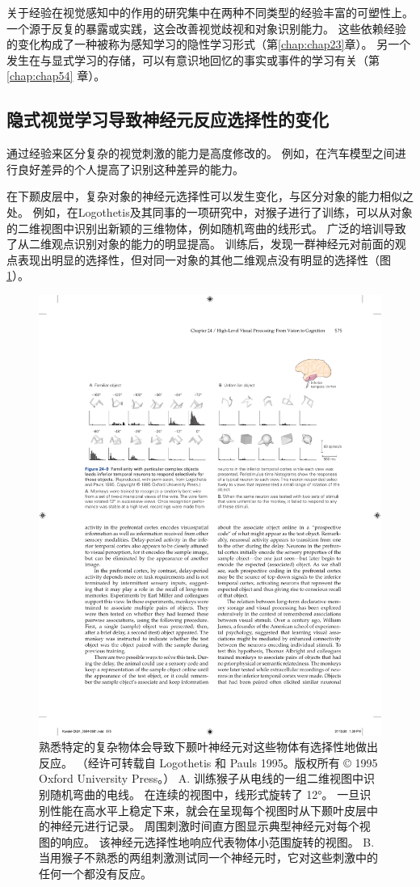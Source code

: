 关于经验在视觉感知中的作用的研究集中在两种不同类型的经验丰富的可塑性上。
一个源于反复的暴露或实践，这会改善视觉歧视和对象识别能力。
这些依赖经验的变化构成了一种被称为感知学习的隐性学习形式（第\ref{chap:chap23}章）。
另一个发生在与显式学习的存储，可以有意识地回忆的事实或事件的学习有关（第\ref{chap:chap54} 章）。


\subsection{隐式视觉学习导致神经元反应选择性的变化}
通过经验来区分复杂的视觉刺激的能力是高度修改的。 
例如，在汽车模型之间进行良好差异的个人提高了识别这种差异的能力。


在下颞皮层中，复杂对象的神经元选择性可以发生变化，与区分对象的能力相似之处。
例如，在Logothetis及其同事的一项研究中，对猴子进行了训练，可以从对象的二维视图中识别出新颖的三维物体，例如随机弯曲的线形式。
广泛的培训导致了从二维观点识别对象的能力的明显提高。 
训练后，发现一群神经元对前面的观点表现出明显的选择性，但对同一对象的其他二维观点没有明显的选择性（图 \ref{fig:24_9}）。

\begin{figure}[htbp]
	\centering
	\includegraphics[width=0.9\linewidth]{chap24/fig_24_9}
	\caption{熟悉特定的复杂物体会导致下颞叶神经元对这些物体有选择性地做出反应。 （经许可转载自 Logothetis 和 Pauls 1995。版权所有 © 1995 Oxford University Press。） A. 训练猴子从电线的一组二维视图中识别随机弯曲的电线。 在连续的视图中，线形式旋转了 12°。 一旦识别性能在高水平上稳定下来，就会在呈现每个视图时从下颞叶皮层中的神经元进行记录。 周围刺激时间直方图显示典型神经元对每个视图的响应。 该神经元选择性地响应代表物体小范围旋转的视图。 B. 当用猴子不熟悉的两组刺激测试同一个神经元时，它对这些刺激中的任何一个都没有反应。}
	\label{fig:24_9}
\end{figure}


